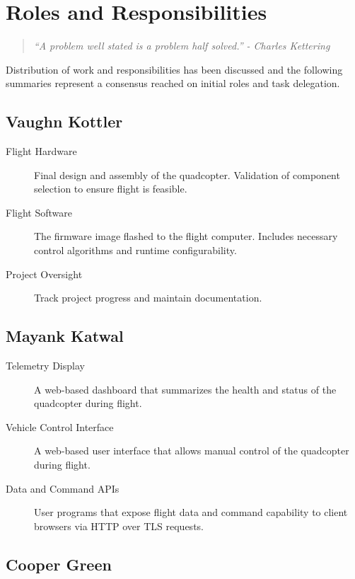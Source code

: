 \documentclass{article}
\begin{document}
\section{Roles and Responsibilities}

\begin{quote}
	\textit{``A problem well stated is a problem half
	solved.'' - Charles Kettering}
\end{quote}

\noindent Distribution of work and responsibilities has been discussed and the
following summaries represent a consensus reached on initial roles and task
delegation.

\subsection{Vaughn Kottler}

\begin{description}
	\item [Flight Hardware] Final design and assembly of the quadcopter.
		Validation of component selection to ensure flight is feasible.
	\item [Flight Software] The firmware image flashed to the flight
		computer. Includes necessary control algorithms and runtime
		configurability.
	\item [Project Oversight] Track project progress and maintain
		documentation.
\end{description}

\subsection{Mayank Katwal}

\begin{description}
	\item [Telemetry Display] A web-based dashboard that summarizes the health
		and status of the quadcopter during flight.
	\item [Vehicle Control Interface] A web-based user interface that allows
		manual control of the quadcopter during flight.
	\item [Data and Command APIs] User programs that expose flight data
		and command capability to client browsers via HTTP over TLS requests.
\end{description}

\subsection{Cooper Green}
\end{document}
